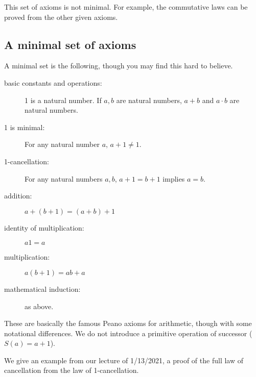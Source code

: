 \documentclass[12pt]{article}
\begin{document}
This set of axioms is not minimal.  For example, the commutative laws can be proved from the other given axioms.

\subsection{A minimal set of axioms}

A minimal set is the following, though you may find this hard to believe.

\begin{description}

\item[basic constants and operations:]  1 is a natural number.   If $a,b$ are natural numbers, $a+b$ and $a\cdot b$ are natural numbers.

\item[1 is minimal:]  For any natural number $a$, $a+1 \neq 1$.

\item[1-cancellation:]  For any natural numbers $a,b$, $a+1=b+1$ implies $a=b$.

\item[addition:]  $a+(b+1)=(a+b)+1$

\item[identity of multiplication:]  $a1 = a$

\item[multiplication:]  $a(b+1) = ab+a$

\item[mathematical induction:]  as above.

\end{description}

These are basically the famous Peano axioms for arithmetic, though with some notational differences.   We do not introduce a primitive operation of successor ($S(a)=a+1$).

We give an example from our lecture of 1/13/2021, a proof of the full law of cancellation from the law of 1-cancellation.
\end{document}
